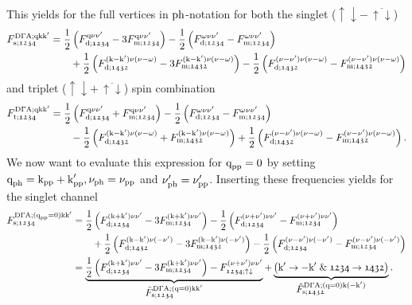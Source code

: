 \documentclass[main.tex]{subfiles}
\begin{document}
This yields for the full vertices in $\text{ph}$-notation for both the singlet ($\uparrow\downarrow-\,\overline{\uparrow\downarrow}$)
\begin{align}
\begin{split}
	F_{\text{s};\mathfrak{1234}}^{\text{D}\Gamma\text{A};\text{q}\text{k}\text{k}'}&=\frac12\left (F_{\text{d};\mathfrak{1234}}^{\text{q}\nu\nu'}-3F_{\text{m};\mathfrak{1234}}^{\text{q}\nu\nu'}\right )-\frac12\left (F_{\text{d};\mathfrak{1234}}^{\omega\nu\nu'}-F_{\text{m};\mathfrak{1234}}^{\omega\nu\nu'}\right )\\
	&\qquad+\frac12\left (F_{\text{d};\mathfrak{1432}}^{(\text{k}-\text{k}')\nu(\nu-\omega)}-3F_{\text{m};\mathfrak{1432}}^{(\text{k}-\text{k}')\nu(\nu-\omega)}\right )-\frac12\left (F_{\text{d};\mathfrak{1432}}^{(\nu-\nu')\nu(\nu-\omega)}-F_{\text{m};\mathfrak{1432}}^{(\nu-\nu')\nu(\nu-\omega)}\right )
\end{split}
\end{align}
and triplet ($\uparrow\downarrow+\,\overline{\uparrow\downarrow}$) spin combination
\begin{align}
\begin{split}
	F_{\text{t};\mathfrak{1234}}^{\text{D}\Gamma\text{A};\text{q}\text{k}\text{k}'}&=\frac12\left (F_{\text{d};\mathfrak{1234}}^{\text{q}\nu\nu'}+F_{\text{m};\mathfrak{1234}}^{\text{q}\nu\nu'}\right )-\frac12\left (F_{\text{d};\mathfrak{1234}}^{\omega\nu\nu'}-F_{\text{m};\mathfrak{1234}}^{\omega\nu\nu'}\right )\\
	&\qquad-\frac12\left (F_{\text{d};\mathfrak{1432}}^{(\text{k}-\text{k}')\nu(\nu-\omega)}+F_{\text{m};\mathfrak{1432}}^{(\text{k}-\text{k}')\nu(\nu-\omega)}\right )+\frac12\left (F_{\text{d};\mathfrak{1432}}^{(\nu-\nu')\nu(\nu-\omega)}-F_{\text{m};\mathfrak{1432}}^{(\nu-\nu')\nu(\nu-\omega)}\right ).
\end{split}
\end{align}
We now want to evaluate this expression for $\text{q}_{\text{pp}}=0$ by setting $\text{q}_{\text{ph}}=\text{k}_{\text{pp}}+\text{k}'_{\text{pp}}, \nu_{\text{ph}}=\nu_{\text{pp}}$ and $\nu'_{\text{ph}}=\nu'_{\text{pp}}$. Inserting these frequencies yields for the singlet channel
\begin{align}
\begin{split}
	F_{\text{s};\mathfrak{1234}}^{\text{D}\Gamma\text{A};(\text{q}_{\text{pp}}=0)\text{k}\text{k}'}&=\frac12\left (F_{\text{d};\mathfrak{1234}}^{(\text{k}+\text{k}')\nu\nu'}-3F_{\text{m};\mathfrak{1234}}^{(\text{k}+\text{k}')\nu\nu'}\right )-\frac12\left (F_{\text{d};\mathfrak{1234}}^{(\nu+\nu')\nu\nu'}-F_{\text{m};\mathfrak{1234}}^{(\nu+\nu')\nu\nu'}\right )\\
	&\qquad+\frac12\left (F_{\text{d};\mathfrak{1432}}^{(\text{k}-\text{k}')\nu(-\nu')}-3F_{\text{m};\mathfrak{1432}}^{(\text{k}-\text{k}')\nu(-\nu')}\right )-\frac12\left (F_{\text{d};\mathfrak{1234}}^{(\nu-\nu')\nu(-\nu')}-F_{\text{m};\mathfrak{1234}}^{(\nu-\nu')\nu(-\nu')}\right )\\
	&=\underbrace{\frac12\left (F_{\text{d};\mathfrak{1234}}^{(\text{k}+\text{k}')\nu\nu'}-3F_{\text{m};\mathfrak{1234}}^{(\text{k}+\text{k}')\nu\nu'}\right )-F_{\mathfrak{1234};\uparrow\downarrow}^{(\nu+\nu')\nu\nu'}}_{\textstyle\tilde{F}_{\text{s};\mathfrak{1234}}^{\text{D}\Gamma\text{A};(\text{q}=0)\text{k}\text{k}'}}+ \underbrace{\left (\text{k}'\rightarrow -\text{k}'\;\&\; \mathfrak{1234}\rightarrow\mathfrak{1432}\right )}_{\textstyle\tilde{F}_{\text{s};\mathfrak{1432}}^{\text{D}\Gamma\text{A};(\text{q}=0)\text{k}(-\text{k}')}}.
\end{split}
\end{align}
\end{document}
